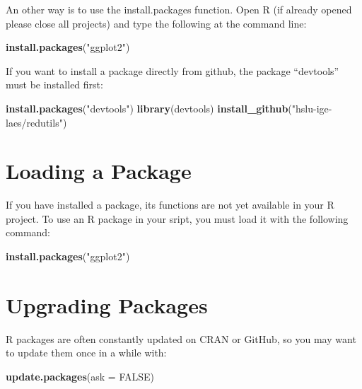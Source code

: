 \documentclass[
  a4paperpaper,
]{book}
\newenvironment{Shaded}{\begin{snugshade}}{\end{snugshade}}
\newcommand{\DataTypeTok}[1]{\textcolor[rgb]{0.13,0.29,0.53}{#1}}
\newcommand{\KeywordTok}[1]{\textcolor[rgb]{0.13,0.29,0.53}{\textbf{#1}}}
\newcommand{\NormalTok}[1]{#1}
\newcommand{\OtherTok}[1]{\textcolor[rgb]{0.56,0.35,0.01}{#1}}
\newcommand{\StringTok}[1]{\textcolor[rgb]{0.31,0.60,0.02}{#1}}
\let\oldShaded\Shaded
\let\endoldShaded\endShaded
\renewenvironment{Shaded}{\footnotesize\oldShaded}{\endoldShaded}
\begin{document}
An other way is to use the install.packages function.
Open R (if already opened please close all projects) and type the following at the command line:

\begin{Shaded}
\begin{Highlighting}[]
\KeywordTok{install.packages}\NormalTok{(}\StringTok{"ggplot2"}\NormalTok{)}
\end{Highlighting}
\end{Shaded}

If you want to install a package directly from github, the package ``devtools'' must be installed first:

\begin{Shaded}
\begin{Highlighting}[]
\KeywordTok{install.packages}\NormalTok{(}\StringTok{"devtools"}\NormalTok{)}
\KeywordTok{library}\NormalTok{(devtools)}
\KeywordTok{install_github}\NormalTok{(}\StringTok{"hslu-ige-laes/redutils"}\NormalTok{)}
\end{Highlighting}
\end{Shaded}

\newpage

\hypertarget{loading-a-package}{%
\section{Loading a Package}\label{loading-a-package}}

If you have installed a package, its functions are not yet available in your R project. To use an R package in your sript, you must load it with the following command:

\begin{Shaded}
\begin{Highlighting}[]
\KeywordTok{install.packages}\NormalTok{(}\StringTok{"ggplot2"}\NormalTok{)}
\end{Highlighting}
\end{Shaded}

\hypertarget{upgrading-packages}{%
\section{Upgrading Packages}\label{upgrading-packages}}

R packages are often constantly updated on CRAN or GitHub, so you may want to update them once in a while with:

\begin{Shaded}
\begin{Highlighting}[]
\KeywordTok{update.packages}\NormalTok{(}\DataTypeTok{ask =} \OtherTok{FALSE}\NormalTok{)}
\end{Highlighting}
\end{Shaded}
\end{document}
